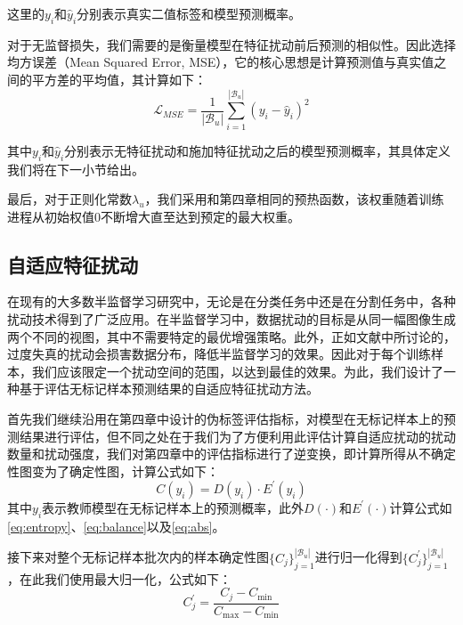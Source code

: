 \documentclass[lang=chs, degree=master, blindreview=false, adobe=false]{yanputhesis}
\begin{document}
这里的$y_{i}$和$\hat{y}_{i}$分别表示真实二值标签和模型预测概率。

对于无监督损失，我们需要的是衡量模型在特征扰动前后预测的相似性。因此选择均方误差（Mean Squared Error, MSE），它的核心思想是计算预测值与真实值之间的平方差的平均值，其计算如下：
\begin{equation}
  \label{eq:AdPLoss_mse}
  \mathcal{L}_{MSE}=\frac{1}{\left|\mathcal{B}_{u}\right|} \sum_{i=1}^{\left|\mathcal{B}_{u}\right|}\left(y_{i}-\hat{y}_{i}\right)^{2}
\end{equation}

其中$y_{i}$和$\hat{y}_{i}$分别表示无特征扰动和施加特征扰动之后的模型预测概率，其具体定义我们将在下一小节给出。

最后，对于正则化常数$\lambda_{u}$，我们采用和第四章相同的预热函数，该权重随着训练进程从初始权值0不断增大直至达到预定的最大权重。
\subsection{自适应特征扰动}
在现有的大多数半监督学习研究中，无论是在分类任务中还是在分割任务中，各种扰动技术得到了广泛应用。在半监督学习中，数据扰动的目标是从同一幅图像生成两个不同的视图，其中不需要特定的最优增强策略。此外，正如文献\cite{yuan2021simple}中所讨论的，过度失真的扰动会损害数据分布，降低半监督学习的效果。因此对于每个训练样本，我们应该限定一个扰动空间的范围，以达到最佳的效果。为此，我们设计了一种基于评估无标记样本预测结果的自适应特征扰动方法。

首先我们继续沿用在第四章中设计的伪标签评估指标，对模型在无标记样本上的预测结果进行评估，但不同之处在于我们为了方便利用此评估计算自适应扰动的扰动数量和扰动强度，我们对第四章中的评估指标进行了逆变换，即计算所得从不确定性图变为了确定性图，计算公式如下：
\begin{equation}
  \label{eq:certainty}
  C\left(y_{i}\right)=D\left(y_{i}\right) \cdot E^{\prime}\left(y_{i}\right)
\end{equation}
其中$y_{i}$表示教师模型在无标记样本上的预测概率，此外$D(\cdot)$和$E^{\prime}(\cdot)$计算公式如\ref{eq:entropy}、\ref{eq:balance}以及\ref{eq:abs}。

接下来对整个无标记样本批次内的样本确定性图$\{ C_j \}_{j=1}^{|\mathcal{B}_u|}$进行归一化得到$\{C_j^{\prime} \}_{j=1}^{|\mathcal{B}_u|}$，在此我们使用最大归一化，公式如下：
\begin{equation}
  \label{eq:normalC}
  C_j^{\prime}=\frac{C_j-C_{\min }}{C_{\max }-C_{\min }}
\end{equation}
\end{document}
